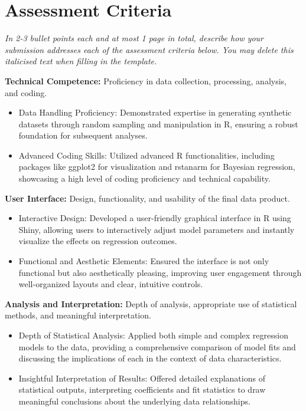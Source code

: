 \documentclass[a4paper, 12pt]{article}
\begin{document}
\section{Assessment Criteria}

\textit{In 2-3 bullet points each and at most 1 page in total, describe how your submission addresses each of the assessment criteria below. You may delete this italicised text when filling in the template.} 

\textbf{Technical Competence:} Proficiency in data collection, processing, analysis, and coding.

\begin{itemize}
    \item Data Handling Proficiency: Demonstrated expertise in generating synthetic datasets through random sampling and manipulation in R, ensuring a robust foundation for subsequent analyses.
    \item Advanced Coding Skills: Utilized advanced R functionalities, including packages like ggplot2 for visualization and rstanarm for Bayesian regression, showcasing a high level of coding proficiency and technical capability.
\end{itemize}

\textbf{User Interface:} Design, functionality, and usability of the final data product.

\begin{itemize}
    \item Interactive Design: Developed a user-friendly graphical interface in R using Shiny, allowing users to interactively adjust model parameters and instantly visualize the effects on regression outcomes.
    \item Functional and Aesthetic Elements: Ensured the interface is not only functional but also aesthetically pleasing, improving user engagement through well-organized layouts and clear, intuitive controls.
\end{itemize}

\textbf{Analysis and Interpretation:} Depth of analysis, appropriate use of statistical methods, and meaningful interpretation.

\begin{itemize}
    \item Depth of Statistical Analysis: Applied both simple and complex regression models to the data, providing a comprehensive comparison of model fits and discussing the implications of each in the context of data characteristics.
    \item Insightful Interpretation of Results: Offered detailed explanations of statistical outputs, interpreting coefficients and fit statistics to draw meaningful conclusions about the underlying data relationships.
\end{itemize}
\end{document}
